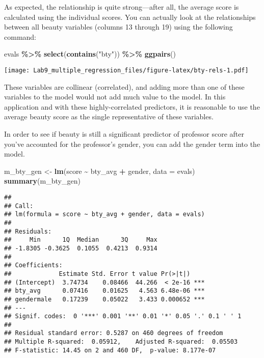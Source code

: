 \documentclass[
]{article}
\newenvironment{Shaded}{\begin{snugshade}}{\end{snugshade}}
\newcommand{\AttributeTok}[1]{\textcolor[rgb]{0.13,0.29,0.53}{#1}}
\newcommand{\FunctionTok}[1]{\textcolor[rgb]{0.13,0.29,0.53}{\textbf{#1}}}
\newcommand{\NormalTok}[1]{#1}
\newcommand{\OtherTok}[1]{\textcolor[rgb]{0.56,0.35,0.01}{#1}}
\newcommand{\SpecialCharTok}[1]{\textcolor[rgb]{0.81,0.36,0.00}{\textbf{#1}}}
\newcommand{\StringTok}[1]{\textcolor[rgb]{0.31,0.60,0.02}{#1}}
\begin{document}
As expected, the relationship is quite strong---after all, the average
score is calculated using the individual scores. You can actually look
at the relationships between all beauty variables (columns 13 through
19) using the following command:

\begin{Shaded}
\begin{Highlighting}[]
\NormalTok{evals }\SpecialCharTok{\%\textgreater{}\%}
  \FunctionTok{select}\NormalTok{(}\FunctionTok{contains}\NormalTok{(}\StringTok{"bty"}\NormalTok{)) }\SpecialCharTok{\%\textgreater{}\%}
  \FunctionTok{ggpairs}\NormalTok{()}
\end{Highlighting}
\end{Shaded}

\texttt{[image: Lab9\_multiple\_regression\_files/figure-latex/bty-rels-1.pdf]}

These variables are collinear (correlated), and adding more than one of
these variables to the model would not add much value to the model. In
this application and with these highly-correlated predictors, it is
reasonable to use the average beauty score as the single representative
of these variables.

In order to see if beauty is still a significant predictor of professor
score after you've accounted for the professor's gender, you can add the
gender term into the model.

\begin{Shaded}
\begin{Highlighting}[]
\NormalTok{m\_bty\_gen }\OtherTok{\textless{}{-}} \FunctionTok{lm}\NormalTok{(score }\SpecialCharTok{\textasciitilde{}}\NormalTok{ bty\_avg }\SpecialCharTok{+}\NormalTok{ gender, }\AttributeTok{data =}\NormalTok{ evals)}
\FunctionTok{summary}\NormalTok{(m\_bty\_gen)}
\end{Highlighting}
\end{Shaded}

\begin{verbatim}
## 
## Call:
## lm(formula = score ~ bty_avg + gender, data = evals)
## 
## Residuals:
##     Min      1Q  Median      3Q     Max 
## -1.8305 -0.3625  0.1055  0.4213  0.9314 
## 
## Coefficients:
##             Estimate Std. Error t value Pr(>|t|)    
## (Intercept)  3.74734    0.08466  44.266  < 2e-16 ***
## bty_avg      0.07416    0.01625   4.563 6.48e-06 ***
## gendermale   0.17239    0.05022   3.433 0.000652 ***
## ---
## Signif. codes:  0 '***' 0.001 '**' 0.01 '*' 0.05 '.' 0.1 ' ' 1
## 
## Residual standard error: 0.5287 on 460 degrees of freedom
## Multiple R-squared:  0.05912,    Adjusted R-squared:  0.05503 
## F-statistic: 14.45 on 2 and 460 DF,  p-value: 8.177e-07
\end{verbatim}
\end{document}
